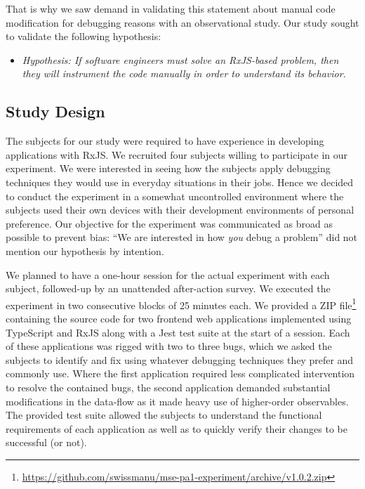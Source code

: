 \documentclass[sigplan,screen,review]{acmart}
\begin{document}
That is why we saw demand in validating this statement about manual code modification for debugging reasons with an observational study. Our study sought to validate the following hypothesis:

\begin{itemize}
	\item \emph{Hypothesis: If software engineers must solve an RxJS-based problem, then they will instrument the code manually in order to understand its behavior.}
\end{itemize}

\subsection{Study Design}

The subjects for our study were required to have experience in developing applications with RxJS. We recruited four subjects willing to participate in our experiment. We were interested in seeing how the subjects apply debugging techniques they would use in everyday situations in their jobs. Hence we decided to conduct the experiment in a somewhat uncontrolled environment where the subjects used their own devices with their development environments of personal preference. Our objective for the experiment was communicated as broad as possible to prevent bias: ``We are interested in how \emph{you} debug a problem'' did not mention our hypothesis by intention.

We planned to have a one-hour session for the actual experiment with each subject, followed-up by an unattended after-action survey. We executed the experiment in two consecutive blocks of 25 minutes each. We provided a ZIP file\footnote{\url{https://github.com/swissmanu/mse-pa1-experiment/archive/v1.0.2.zip}} containing the source code for two frontend web applications implemented using TypeScript and RxJS along with a Jest test suite at the start of a session. Each of these applications was rigged with two to three bugs, which we asked the subjects to identify and fix using whatever debugging techniques they prefer and commonly use. Where the first application required less complicated intervention to resolve the contained bugs, the second application demanded substantial modifications in the data-flow as it made heavy use of higher-order observables. The provided test suite allowed the subjects to understand the functional requirements of each application as well as to quickly verify their changes to be successful (or not).
\end{document}
